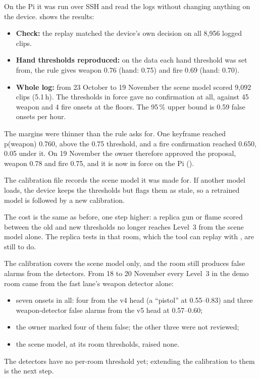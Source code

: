 On the Pi it was run over SSH and read the logs without changing anything on the device.  shows the results:
\begin{itemize}
\item \textbf{Check:} the replay matched the device's own decision on all 8,956 logged clips.
\item \textbf{Hand thresholds reproduced:} on the data each hand threshold was set from, the rule gives weapon 0.76 (hand: 0.75) and fire 0.69 (hand: 0.70).
\item \textbf{Whole log:} from 23 October to 19 November the scene model scored 9,092 clips (5.1\,h). The thresholds in force gave no confirmation at all, against 45 weapon and 4 fire onsets at the floors. The 95\,\% upper bound is 0.59 false onsets per hour.
\end{itemize}

The margins were thinner than the rule asks for. One keyframe reached p(weapon) 0.760, above the 0.75 threshold, and a fire confirmation reached 0.650, 0.05 under it. On 19 November the owner therefore approved the proposal, weapon 0.78 and fire 0.75, and it is now in force on the Pi ().

The calibration file records the scene model it was made for. If another model loads, the device keeps the thresholds but flags them as stale, so a retrained model is followed by a new calibration.

The cost is the same as before, one step higher: a replica gun or flame scored between the old and new thresholds no longer reaches Level~3 from the scene model alone. The replica tests in that room, which the tool can replay with , are still to do.

The calibration covers the scene model only, and the room still produces false alarms from the detectors. From 18 to 20 November every Level~3 in the demo room came from the fast lane's weapon detector alone:
\begin{itemize}
\item seven onsets in all: four from the v4 head (a ``pistol'' at 0.55--0.83) and three weapon-detector false alarms from the v5 head at 0.57--0.60;
\item the owner marked four of them false; the other three were not reviewed;
\item the scene model, at its room thresholds, raised none.
\end{itemize}
The detectors have no per-room threshold yet; extending the calibration to them is the next step.

